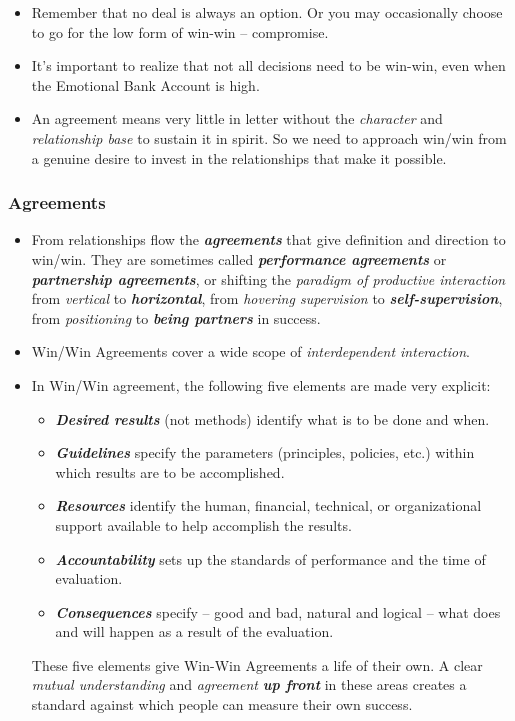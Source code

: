 \documentclass[11pt]{article}
\begin{document}
\begin{itemize}
\item Remember that no deal is always an option. Or you may occasionally choose to go for the low form of win-win -- compromise.

\item It's important to realize that not all decisions need to be win-win, even when the Emotional Bank Account is high.

\item  An agreement means very little in letter without the \emph{character} and \emph{relationship base} to sustain it in spirit. So we need to approach win/win from a genuine desire to invest in the relationships that make it possible.
\end{itemize}
\subsubsection{Agreements}
\begin{itemize}
\item From relationships flow the \emph{\textbf{agreements}} that give definition and direction to win/win. They are sometimes called \emph{\textbf{performance agreements}} or \emph{\textbf{partnership agreements}}, or shifting the \emph{paradigm of productive interaction} from \emph{vertical} to \emph{\textbf{horizontal}}, from \emph{hovering supervision} to \emph{\textbf{self-supervision}}, from \emph{positioning} to \emph{\textbf{being partners}} in success.

\item Win/Win Agreements cover a wide scope of \emph{interdependent interaction}. 

\item In Win/Win agreement, the following five elements are made very explicit:
\begin{itemize}
\item \emph{\textbf{Desired results}} (not methods) identify what is to be done and when.
\item \emph{\textbf{Guidelines}} specify the parameters (principles, policies, etc.) within which results are to be accomplished.
\item \emph{\textbf{Resources}} identify the human, financial, technical, or organizational support available to help accomplish the results.
\item \emph{\textbf{Accountability}} sets up the standards of performance and the time of evaluation.
\item \emph{\textbf{Consequences}} specify -- good and bad, natural and logical -- what does and will happen as a result of the evaluation.
\end{itemize}
These five elements give Win-Win Agreements a life of their own. A clear \emph{mutual understanding} and \emph{agreement} \emph{\textbf{up front}} in these areas creates a standard against which people can measure their own success.
\end{itemize}
\end{document}
